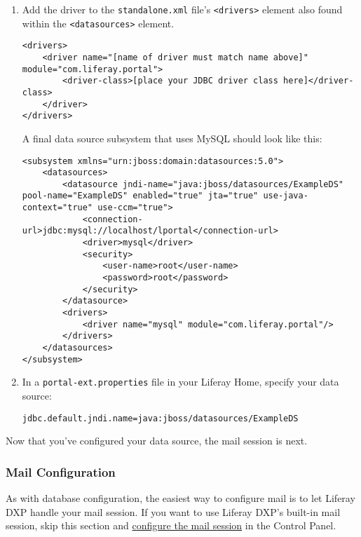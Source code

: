 \begin{enumerate}
\def\labelenumi{\arabic{enumi}.}
\setcounter{enumi}{1}
\item
  Add the driver to the \texttt{standalone.xml} file's
  \texttt{\textless{}drivers\textgreater{}} element also found within
  the \texttt{\textless{}datasources\textgreater{}} element.

\begin{verbatim}
<drivers>
    <driver name="[name of driver must match name above]" module="com.liferay.portal">
        <driver-class>[place your JDBC driver class here]</driver-class>
    </driver>
</drivers>
\end{verbatim}

  A final data source subsystem that uses MySQL should look like this:

\begin{verbatim}
<subsystem xmlns="urn:jboss:domain:datasources:5.0">
    <datasources>
        <datasource jndi-name="java:jboss/datasources/ExampleDS" pool-name="ExampleDS" enabled="true" jta="true" use-java-context="true" use-ccm="true">
            <connection-url>jdbc:mysql://localhost/lportal</connection-url>
            <driver>mysql</driver>
            <security>
                <user-name>root</user-name>
                <password>root</password>
            </security>
        </datasource>
        <drivers>
            <driver name="mysql" module="com.liferay.portal"/>
        </drivers>
    </datasources>
</subsystem>
\end{verbatim}
\item
  In a \texttt{portal-ext.properties} file in your Liferay Home, specify
  your data source:

\begin{verbatim}
jdbc.default.jndi.name=java:jboss/datasources/ExampleDS
\end{verbatim}
\end{enumerate}

Now that you've configured your data source, the mail session is next.

\subsubsection{Mail Configuration}\label{mail-configuration-1}

As with database configuration, the easiest way to configure mail is to
let Liferay DXP handle your mail session. If you want to use Liferay
DXP's built-in mail session, skip this section and
\href{/docs/7-1/deploy/-/knowledge_base/d/installing-liferay\#configuring-mail}{configure
the mail session} in the Control Panel.

